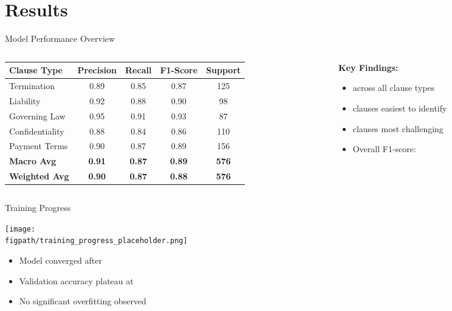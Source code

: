 
\section{Results}

\begin{frame}{Model Performance Overview}
\begin{columns}
\begin{column}{0.6\textwidth}
\begin{table}[h]
\centering
\begin{tabular}{@{}lcccc@{}}
\toprule
\textbf{Clause Type} & \textbf{Precision} & \textbf{Recall} & \textbf{F1-Score} & \textbf{Support} \\
\midrule
Termination & 0.89 & 0.85 & 0.87 & 125 \\
Liability & 0.92 & 0.88 & 0.90 & 98 \\
Governing Law & 0.95 & 0.91 & 0.93 & 87 \\
Confidentiality & 0.88 & 0.84 & 0.86 & 110 \\
Payment Terms & 0.90 & 0.87 & 0.89 & 156 \\
\midrule
\textbf{Macro Avg} & \textbf{0.91} & \textbf{0.87} & \textbf{0.89} & \textbf{576} \\
\textbf{Weighted Avg} & \textbf{0.90} & \textbf{0.87} & \textbf{0.88} & \textbf{576} \\
\bottomrule
\end{tabular}
\end{table}
\end{column}
\begin{column}{0.4\textwidth}
\textbf{Key Findings:}
\begin{itemize}
    \item {} across all clause types
    \item {} clauses easiest to identify
    \item {} clauses most challenging
    \item Overall F1-score: 
\end{itemize}
\end{column}
\end{columns}
\end{frame}

\begin{frame}{Training Progress}
\begin{center}
\texttt{[image: \\figpath/training\_progress\_placeholder.png]}
\end{center}

\begin{itemize}
    \item Model converged after 
    \item Validation accuracy plateau at 
    \item No significant overfitting observed
\end{itemize}
\end{frame}

